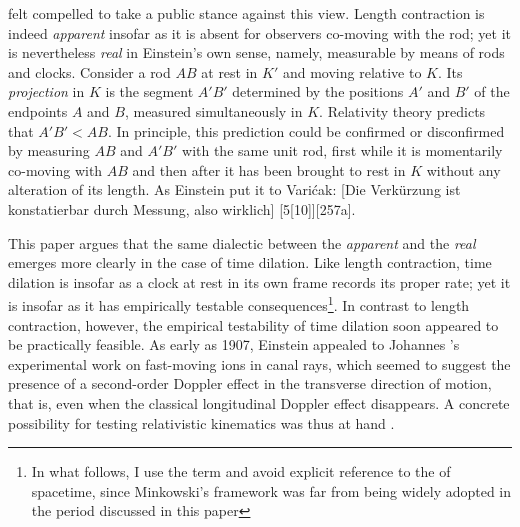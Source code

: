 \documentclass[submitted,12pt]{article}
\newcommand{\tDe}{transverse Doppler effect\xspace}
\begin{document}
\citet{Einstein1911d} felt compelled to take a public stance against this view. Length contraction is indeed \emph{apparent} insofar as it is absent for observers co-moving with the rod; yet it is nevertheless \emph{real} in Einstein’s own sense, namely, measurable by means of rods and clocks. Consider a rod $AB$ at rest in $K'$ and moving relative to $K$. Its \emph{projection} in $K$ is the segment $A'B'$ determined by the positions $A'$ and $B'$ of the endpoints $A$ and $B$, measured simultaneously in $K$. Relativity theory predicts that $A'B'<AB$. In principle, this prediction could be confirmed or disconfirmed by measuring $AB$ and $A'B'$ with the same unit rod, first while it is momentarily co-moving with $AB$ and then after it has been brought to rest in $K$ without any alteration of its length. As Einstein put it to Varićak:  [Die Verkürzung ist konstatierbar durch Messung, also wirklich] [5{[}10{]}][257a]. 



This paper argues that the same dialectic between the \emph{apparent} and the \emph{real} emerges more clearly in the case of time dilation. Like length contraction, time dilation is  insofar as a clock at rest in its own frame records its proper rate; yet it is  insofar as it has empirically testable consequences\footnote{In what follows, I use the term  and avoid explicit reference to the  of spacetime, since Minkowski’s framework was far from being widely adopted in the period discussed in this paper}. In contrast to length contraction, however, the empirical testability of time dilation soon appeared to be practically feasible. As early as 1907, Einstein appealed to Johannes \citet{Stark1906}’s experimental work on fast-moving ions in canal rays, which seemed to suggest the presence of a second-order Doppler effect in the transverse direction of motion, that is, even when the classical longitudinal Doppler effect disappears. A concrete possibility for testing relativistic kinematics was thus at hand \citep{Giuliani2013}.

\end{document}
